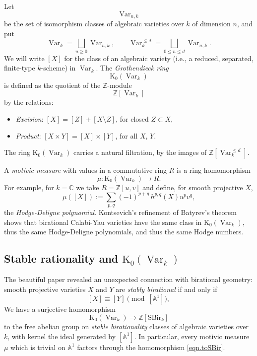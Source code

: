 \documentclass[12pt,reqno]{amsart}
\theoremstyle{plain}
\theoremstyle{remark}
\theoremstyle{definition}
\numberwithin{equation}{section}
\newcommand{\C}{{\mathbb C}}
\newcommand{\bA}{{\mathbb A}}
\newcommand{\bF}{{\mathbb F}}
\newcommand{\bZ}{{\mathbb Z}}
\DeclareMathOperator{\Var}{Var}
\begin{document}
Let 
$$
\Var_{n,k}
$$
be the set of isomorphism classes of algebraic varieties over $k$ of dimension $n$, and put
$$
\Var_k = \bigsqcup_{n\ge 0} \Var_{n,k},
\qquad
\Var_k^{\le d} = \bigsqcup_{0\le n\le d} \Var_{n,k}.
$$
We will write $[X]$ for the class of an algebraic variety (i.e., a reduced, separated, finite-type $k$-scheme) in $\Var_k$. 
The {\em Grothendieck ring}
$$
\mathrm K_0(\Var_k)
$$
is defined as the quotient of the $\bZ$-module 
$$
\bZ[\Var_k]
$$
by the relations:
\begin{itemize}
\item {\em Excision}:  $[X]=[Z]+[X\setminus Z]$, for closed $Z\subset X$,
\item {\em Product}: $[X\times Y] = [X]\times [Y]$, for all $X$, $Y$.
\end{itemize}
The ring $\mathrm K_0(\Var_k)$ carries a natural filtration, by the images of $\bZ[\Var_k^{\le d}]$. 

A {\em motivic measure} with values in a commutative ring $R$ is a ring homomorphism 
$$
\mu\colon \mathrm K_0(\Var_k) \to R.
$$
For example, for $k=\C$ we take $R=\bZ[u,v]$ and 
define, for smooth projective $X$,  
$$
\mu([X]) := \sum_{p,q} (-1)^{p+q}\,  h^{p,q}(X)u^pv^q,
$$
the {\em Hodge-Deligne polynomial}. 
Kontsevich's refinement of Batyrev's theorem shows that 
birational Calabi-Yau varieties have the same class in $\mathrm K_0(\Var_k)$, thus the same Hodge-Deligne polynomials, and thus the same Hodge numbers. 


\subsection*{Stable rationality and $\mathrm K_0(\Var_k)$}
The beautiful paper \cite{larsenlunts} revealed an unexpected connection with birational geometry: smooth projective varieties $X$ and $Y$ are {\em stably birational} if and only if 
\[
[X] \equiv [Y] \pmod{[\bA^1]}, 
\]
We have a surjective homomorphism
\begin{equation}
\label{eqn.toSBir}
\mathrm K_0(\Var_k) \to \bZ[\mathrm{SBir}_k]
\end{equation}
to the free abelian group on {\em stable birationality} classes of algebraic varieties over $k$, with kernel the ideal generated by $[\bA^1]$.
In particular, every motivic measure $\mu$ which is trivial on $\bA^1$ factors through the homomorphism \eqref{eqn.toSBir}.
\end{document}

